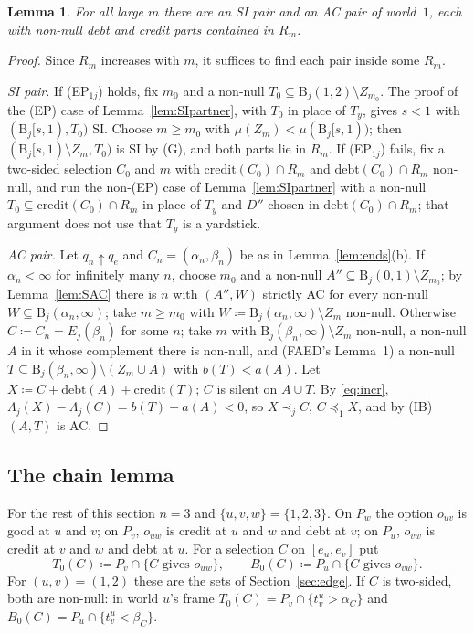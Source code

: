 \documentclass[11pt]{article}
\newtheorem{lemma}[theorem]{Lemma}
\theoremstyle{definition}\newtheorem{definition}[theorem]{Definition}
\theoremstyle{remark}\newtheorem{remark}[theorem]{Remark}
\newcommand{\debt}{\mathrm{debt}}
\newcommand{\cred}{\mathrm{credit}}
\newcommand{\Band}{\mathrm{B}}
\begin{document}
\begin{lemma}\label{lem:pairsoff}
For all large $m$ there are an SI pair and an AC pair of world~$1$,
each with non-null debt and credit parts contained in $R_m$.
\end{lemma}
\begin{proof}
Since $R_m$ increases with $m$, it suffices to find each pair inside some
$R_m$.

\emph{SI pair.} If (EP$_{1j}$) holds, fix $m_0$ and a non-null
$T_0\subseteq\Band_j(1,2)\setminus Z_{m_0}$. The proof of the (EP) case of
Lemma~\ref{lem:SIpartner}, with $T_0$ in place of $T_y$, gives $s<1$ with
$(\Band_j[s,1),T_0)$ SI. Choose $m\ge m_0$ with
$\mu(Z_m)<\mu(\Band_j[s,1))$; then $(\Band_j[s,1)\setminus Z_m,T_0)$ is
SI by (G), and both parts lie in $R_m$. If (EP$_{1j}$) fails, fix a
two-sided selection $C_0$ and $m$ with $\cred(C_0)\cap R_m$ and
$\debt(C_0)\cap R_m$ non-null, and run the non-(EP) case of
Lemma~\ref{lem:SIpartner} with a non-null $T_0\subseteq\cred(C_0)\cap R_m$
in place of $T_y$ and $D''$ chosen in $\debt(C_0)\cap R_m$; that argument
does not use that $T_y$ is a yardstick.

\emph{AC pair.} Let $q_n\uparrow q_e$ and $C_n=(\alpha_n,\beta_n)$ be as in
Lemma~\ref{lem:ends}(b). If $\alpha_n<\infty$ for infinitely many $n$,
choose $m_0$ and a non-null $A''\subseteq\Band_j(0,1)\setminus Z_{m_0}$; by
Lemma~\ref{lem:SAC} there is $n$ with $(A'',W)$ strictly AC for every
non-null $W\subseteq\Band_j(\alpha_n,\infty)$; take $m\ge m_0$ with
$W\coloneqq\Band_j(\alpha_n,\infty)\setminus Z_m$ non-null. Otherwise
$C\coloneqq C_n=E_j(\beta_n)$ for some $n$; take $m$ with
$\Band_j(\beta_n,\infty)\setminus Z_m$ non-null, a non-null $A$ in it
whose complement there is non-null, and
(FAED's Lemma~1) a non-null $T\subseteq\Band_j(\beta_n,\infty)\setminus(Z_m
\cup A)$ with $b(T)<a(A)$. Let $X\coloneqq C+\debt(A)+\cred(T)$; $C$ is silent
on $A\cup T$. By \eqref{eq:incr}, $\Lambda_j(X)-\Lambda_j(C)=b(T)-a(A)<0$, so
$X\prec_jC$, $C\preceq_1X$, and by (IB) $(A,T)$ is AC.
\end{proof}

\subsection{The chain lemma}

For the rest of this section $n=3$ and $\{u,v,w\}=\{1,2,3\}$. On $P_w$ the
option $o_{uv}$ is good at $u$ and $v$; on $P_v$, $o_{uw}$ is credit at $u$ and
$w$ and debt at $v$; on $P_u$, $o_{vw}$ is credit at $v$ and $w$ and debt at
$u$. For a selection $C$ on $[e_u,e_v]$ put
\[
 T_0(C)\coloneqq P_v\cap\{C\text{ gives }o_{uw}\},\qquad
 B_0(C)\coloneqq P_u\cap\{C\text{ gives }o_{vw}\}.
\]
For $(u,v)=(1,2)$ these are the sets of Section~\ref{sec:edge}. If $C$ is
two-sided, both are non-null: in world $u$'s frame $T_0(C)=P_v\cap
\{t^u_v>\alpha_C\}$ and $B_0(C)=P_u\cap\{t^u_v<\beta_C\}$.
\end{document}
